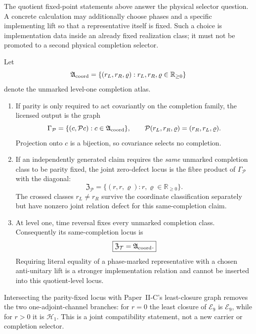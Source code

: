 \documentclass[12pt,a4paper]{article}
\begin{document}
\begin{remark}
The quotient fixed-point statements above answer the physical selector
question.  A concrete calculation may additionally choose phases and a
specific implementing lift so that a representative itself is fixed.  Such a
choice is implementation data inside an already fixed realization class; it
must not be promoted to a second physical completion selector.
\end{remark}

\begin{corollary}
\label{p2d:cor:joint-completion-symmetry-loci}
Let
\[
 \mathfrak A_{\rm coord}
 =\{(r_L,r_R,\varrho):
       r_L,r_R,\varrho\in\mathbb R_{\geq0}\}
\]
denote the unmarked level-one completion atlas.
\begin{enumerate}[label=(\roman*),leftmargin=2.2em]
\item If parity is only required to act covariantly on the completion family,
the licensed output is the graph
\[
 \Gamma_{\mathcal P}
 =\{(c,\mathcal P c):c\in\mathfrak A_{\rm coord}\},
 \qquad
 \mathcal P(r_L,r_R,\varrho)=(r_R,r_L,\varrho).
\]
Projection onto \(c\) is a bijection, so covariance selects no completion.
\item If an independently generated claim requires the \emph{same} unmarked
completion class to be parity fixed, the joint zero-defect locus is the fibre
product of \(\Gamma_{\mathcal P}\) with the diagonal:
\[
 \boxed{\mathfrak Z_{\mathcal P}
 =\{(r,r,\varrho):r,\varrho\in\mathbb R_{\geq0}\}.}
\]
The crossed classes \(r_L\neq r_R\) survive the coordinate classification
separately but have nonzero joint relation defect for this same-completion
claim.
\item At level one, time reversal fixes every unmarked completion class.
Consequently its same-completion locus is
\[
 \boxed{\mathfrak Z_{\mathcal T}=\mathfrak A_{\rm coord}.}
\]
Requiring literal equality of a phase-marked representative with a chosen
anti-unitary lift is a stronger implementation relation and cannot be inserted
into this quotient-level locus.
\end{enumerate}
Intersecting the parity-fixed locus with Paper~II-C's least-closure graph
removes the two one-adjoint-channel branches: for \(r=0\) the least closure of
\(\mathcal E_9\) is \(\mathcal E_9\), while for \(r>0\) it is
\(\mathcal H_1\).  This is a joint compatibility statement, not a new carrier
or completion selector.
\end{corollary}
\end{document}
